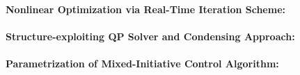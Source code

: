 \paragraph{Nonlinear Optimization via Real-Time Iteration Scheme:} 
\paragraph{Structure-exploiting QP Solver and Condensing Approach:} 
\paragraph{Parametrization of Mixed-Initiative Control Algorithm:} 
